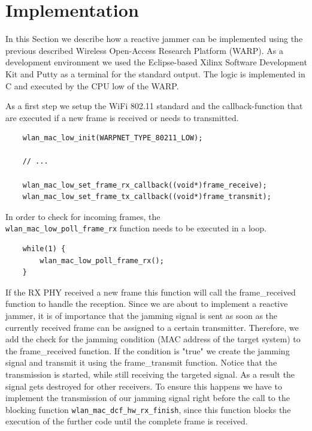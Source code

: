 \documentclass[sigconf]{acmart}
\begin{document}
\section{Implementation}

In this Section we describe how a reactive jammer can be implemented using the previous described
Wireless Open-Access Research Platform (WARP). As a development environment we used the Eclipse-based
Xilinx Software Development Kit and Putty as a terminal for the standard output. The logic is
implemented in C and executed by the CPU low of the WARP.

\pagebreak

As a first step we setup the WiFi 802.11 standard and the callback-function that are executed if a
new frame is received or needs to transmitted. 

\begin{verbatim}
	wlan_mac_low_init(WARPNET_TYPE_80211_LOW);

	// ...

	wlan_mac_low_set_frame_rx_callback((void*)frame_receive);
	wlan_mac_low_set_frame_tx_callback((void*)frame_transmit);
\end{verbatim}

In order to check for incoming frames, the\\\texttt{wlan\_mac\_low\_poll\_frame\_rx} function needs to be executed
in a loop. 

\begin{verbatim}
	while(1) {
	    wlan_mac_low_poll_frame_rx();
	}
\end{verbatim}

If the RX PHY received a new frame this function will call the frame\_received function to handle the
reception. Since we are about to implement a reactive jammer, it is of importance that the jamming
signal is sent as soon as the currently received frame can be assigned to a certain transmitter.
Therefore, we add the check for the jamming condition (MAC address of the target system) to the
frame\_received function. If the condition is "true" we create the jamming signal and transmit it
using the frame\_transmit function. Notice that the transmission is started, while still
receiving the targeted signal. As a result the signal gets destroyed for other receivers. To ensure
this happens we have to implement the transmission of our jamming signal right before the call to the
blocking function \texttt{wlan\_mac\_dcf\_hw\_rx\_finish}, since this function blocks the execution of the further
code until the complete frame is received.
\end{document}
